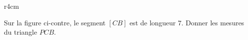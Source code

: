 
\begin{exercice}\label{exosmath-0443}

\begin{wrapfigure}{r}{4cm}
   \vspace{-1cm}        %
   \centering
   
\end{wrapfigure}

Sur la figure ci-contre, le segment \( [CB]\) est de longueur \( 7\). Donner les mesures du triangle \( PCB\).

\end{exercice}
